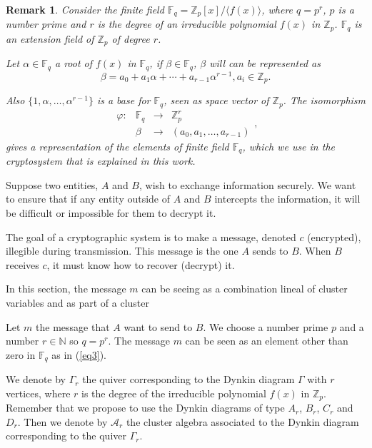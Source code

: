 \documentclass[12pt,a4paper]{article}
\newtheorem{Remark}[Theorem]{Remark}
\begin{document}
\begin{Remark}


Consider the finite field $\mathbb{F}_{q}=\mathbb{Z}_p[x]/\langle f(x) \rangle$, where $q=p^r$, $p$ is a number prime and $r$ is the degree of an irreducible polynomial $f(x)$ in $\mathbb{Z}_p$. $\mathbb{F}_{q}$ is an extension field of $\mathbb{Z}_p$ of degree $r$.

Let $\alpha \in \mathbb{F}_q$ a root of $f(x)$ in $\mathbb{F}_{q}$, if $\beta \in \mathbb{F}_q$, $\beta$ will can be represented as $$\beta = a_0 + a_1 \alpha + \cdots + a_{r-1}\alpha^{r-1}, a_i \in \mathbb{Z}_p.$$

Also $\lbrace 1,\alpha,\ldots, \alpha^{r-1} \rbrace$ is a base for $\mathbb{F}_q$, seen as space vector of $\mathbb{Z}_p$. The isomorphism
\begin{equation}
\begin{array}{rlcl}
\varphi: & \mathbb{F}_q & \rightarrow & \mathbb{Z}^r_p \\
    & \beta & \rightarrow & (a_0,a_1,\ldots, a_{r-1})
\end{array},
\label{eq3}
\end{equation} gives a representation of the elements of finite field $\mathbb{F}_q$, which we use in the cryptosystem  that is  explained in this work.
\end{Remark}

Suppose two entities, $A$ and $B$, wish to exchange information securely. We want to ensure that if any entity outside of $A$ and $B$ intercepts the information, it will be difficult or impossible for them to decrypt it.

The goal of a cryptographic system is to make a message, denoted $c$ (encrypted), illegible during transmission. This message is the one $ A $ sends to $B$. 
When $ B$ receives $c$, it must know how to recover (decrypt) it.

In this section, the message $m$ can be seeing as a combination lineal of cluster variables and as part of a cluster

Let $m$ the message that  $A$ want to send  to $B$. We choose a number prime $p$ and a number $r\in \mathbb{N}$ so $q=p^r$. The message $m$ can be seen as an element other than zero in $\mathbb{F}_{q}$ as in (\ref{eq3}).  

We denote by $\Gamma_r$ the quiver corresponding to the Dynkin diagram $\Gamma$ with $r$ vertices, where $r$ is the degree of the irreducible polynomial $f(x)$ in $\mathbb{Z}_p$. Remember that we propose to use the Dynkin diagrams of type $A_r$, $B_r$, $C_r$ and $D_r$. Then we denote by $\mathcal{A}_{r}$  the cluster algebra associated to the Dynkin diagram corresponding to the quiver $\Gamma_r$.
\end{document}
